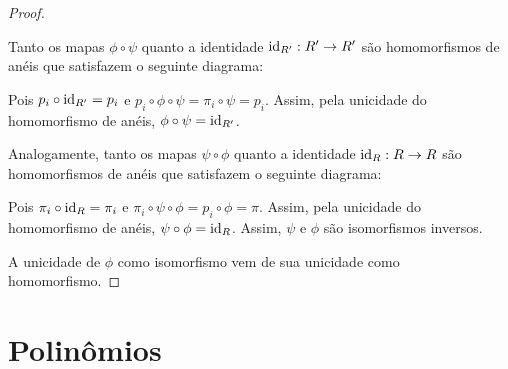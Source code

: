 \begin{proof}
    \begin{figure}[H]
        \centering
    \end{figure}

    Tanto os mapas $\phi\circ \psi$ quanto a identidade $\operatorname{id}_{R'}:R'\rightarrow R'$ são homomorfismos de anéis que satisfazem o seguinte diagrama:

    \begin{figure}[H]
        \centering
    \end{figure}

    Pois $p_i\circ \operatorname{id}_{R'}=p_i$ e $p_i\circ \phi\circ\psi=\pi_i\circ \psi=p_i$.
    Assim, pela unicidade do homomorfismo de anéis, $\phi\circ \psi=\operatorname{id}_{R'}$.

    Analogamente, tanto os mapas $\psi\circ \phi$ quanto a identidade $\operatorname{id}_{R}:R\rightarrow R$ são homomorfismos de anéis que satisfazem o seguinte diagrama:
    \begin{figure}[H]
        \centering
    \end{figure}

    Pois $\pi_i\circ \operatorname{id}_{R}=\pi_i$ e $\pi_i\circ \psi\circ\phi=p_i\circ \phi=\pi$.
    Assim, pela unicidade do homomorfismo de anéis, $\psi\circ \phi=\operatorname{id}_{R}$. Assim, $\psi$ e $\phi$ são isomorfismos inversos.

    A unicidade de $\phi$ como isomorfismo vem de sua unicidade como homomorfismo.
\end{proof}

\section{Polinômios}

